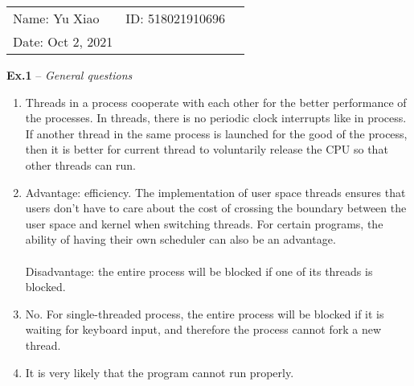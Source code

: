 \documentclass{article}
\begin{document}
\begin{spacing}{2.0}
\vspace*{0.25cm}
\hrulefill
\thispagestyle{empty}
\begin{center}
\begin{large}
\end{large}

\hrulefill


\vspace*{5cm}
\begin{Large}
\end{Large}
\vspace{2em}
\end{center}
\vfill

\begin{table}[h!]
\flushleft
\begin{tabular}{lll}
Name: Yu Xiao \hspace*{2em}&
ID: 518021910696 \hspace*{2em}\\

Date: Oct 2, 2021
\end{tabular}
\end{table}
\end{spacing}

\hfill

\newpage
\noindent\textbf{Ex.1} -- \textit{General questions}
\begin{enumerate}
\item
Threads in a process cooperate with each other for the better performance of the processes. In threads, there is no periodic clock interrupts like in process. If another thread in the same process is launched for the good of the process, then it is better for current thread to voluntarily release the CPU so that other threads can run.
\item
Advantage: efficiency. The implementation of user space threads ensures that users don't have to care about the cost of crossing the boundary between the user space and kernel when switching threads. For certain programs, the ability of having their own scheduler can also be an advantage.\\ \\
Disadvantage: the entire process will be blocked if one of its threads is blocked.
\item
No. For single-threaded process, the entire process will be blocked if it is waiting for keyboard input, and therefore the process cannot fork a new thread.
\item
It is very likely that the program cannot run properly.
\end{enumerate}
\end{document}
